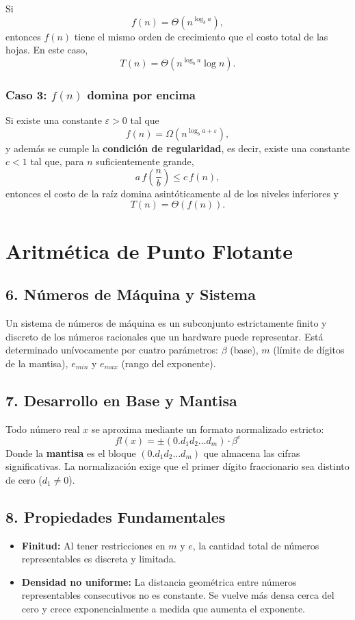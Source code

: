 \documentclass[12pt]{article}
\begin{document}
Si
\[
\boxed{
f(n)=\Theta\!\left(n^{\log_b a}\right),
}
\]
entonces $f(n)$ tiene el mismo orden de crecimiento que el costo total
de las hojas. En este caso,
\[
\boxed{
T(n)=\Theta\!\left(
n^{\log_b a}\log n
\right).
}
\]

\subsubsection*{Caso 3: $f(n)$ domina por encima}

Si existe una constante $\varepsilon>0$ tal que
\[\boxed{f(n)=\Omega\!\left(n^{\log_b a+\varepsilon}\right),}
\]
y además se cumple la \textbf{condición de regularidad}, es decir,
existe una constante $c<1$ tal que, para $n$ suficientemente grande,
\[
\boxed{
a\,f\!\left(\frac{n}{b}\right)\leq c\,f(n),
}
\]
entonces el costo de la raíz domina asintóticamente al de los niveles
inferiores y
\[
\boxed{
T(n)=\Theta(f(n)).
}
\]
\section*{Aritmética de Punto Flotante}

\subsection*{6. Números de Máquina y Sistema}
Un sistema de números de máquina es un subconjunto estrictamente finito y discreto de los números racionales que un hardware puede representar. Está determinado unívocamente por cuatro parámetros: $\beta$ (base), $m$ (límite de dígitos de la mantisa), $e_{min}$ y $e_{max}$ (rango del exponente).

\subsection*{7. Desarrollo en Base y Mantisa}
Todo número real $x$ se aproxima mediante un formato normalizado estricto:
\begin{equation}
    fl(x) = \pm (0.d_1 d_2 \dots d_m) \cdot \beta^e
\end{equation}
Donde la \textbf{mantisa} es el bloque $(0.d_1 d_2 \dots d_m)$ que almacena las cifras significativas. La normalización exige que el primer dígito fraccionario sea distinto de cero ($d_1 \neq 0$).

\subsection*{8. Propiedades Fundamentales}
\begin{itemize}
    \item \textbf{Finitud:} Al tener restricciones en $m$ y $e$, la cantidad total de números representables es discreta y limitada.
    \item \textbf{Densidad no uniforme:} La distancia geométrica entre números representables consecutivos no es constante. Se vuelve más densa cerca del cero y crece exponencialmente a medida que aumenta el exponente.
\end{itemize}
\end{document}
